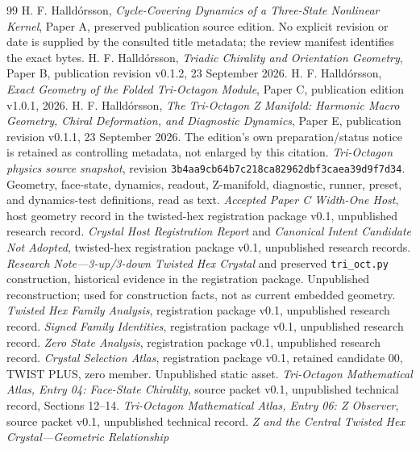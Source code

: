 \documentclass[11pt,a4paper]{article}
\numberwithin{equation}{section}
\begin{document}
\begin{thebibliography}{99}
H. F. Halldórsson, \emph{Cycle-Covering Dynamics of a Three-State Nonlinear
Kernel}, Paper A, preserved publication source edition. No explicit revision
or date is supplied by the consulted title metadata; the review manifest
identifies the exact bytes.
H. F. Halldórsson, \emph{Triadic Chirality and Orientation Geometry},
Paper B, publication revision v0.1.2, 23 September 2026.
H. F. Halldórsson, \emph{Exact Geometry of the Folded Tri-Octagon Module},
Paper C, publication edition v1.0.1, 2026.
H. F. Halldórsson, \emph{The Tri-Octagon Z Manifold: Harmonic Macro Geometry,
Chiral Deformation, and Diagnostic Dynamics}, Paper E, publication revision
v0.1.1, 23 September 2026. The edition's own preparation/status notice is
retained as controlling metadata, not enlarged by this citation.
\emph{Tri-Octagon physics source snapshot}, revision
\texttt{3b4aa9cb64b7c218ca82962dbf3caea39d9f7d34}.
Geometry, face-state, dynamics, readout, Z-manifold, diagnostic, runner,
preset, and dynamics-test definitions, read as text.
\emph{Accepted Paper C Width-One Host}, host geometry record in the
twisted-hex registration package v0.1, unpublished research record.
\emph{Crystal Host Registration Report} and
\emph{Canonical Intent Candidate Not Adopted}, twisted-hex registration
package v0.1, unpublished research records.
\emph{Research Note---3-up/3-down Twisted Hex Crystal} and preserved
\texttt{tri\_oct.py} construction, historical evidence in the registration
package. Unpublished reconstruction; used for construction facts, not as
current embedded geometry.
\emph{Twisted Hex Family Analysis}, registration package v0.1,
unpublished research record.
\emph{Signed Family Identities}, registration package v0.1,
unpublished research record.
\emph{Zero State Analysis}, registration package v0.1,
unpublished research record.
\emph{Crystal Selection Atlas}, registration package v0.1,
retained candidate 00, TWIST PLUS, zero member. Unpublished static asset.
\emph{Tri-Octagon Mathematical Atlas, Entry 04: Face-State Chirality},
source packet v0.1, unpublished technical record, Sections 12--14.
\emph{Tri-Octagon Mathematical Atlas, Entry 06: Z Observer},
source packet v0.1, unpublished technical record.
\emph{Z and the Central Twisted Hex Crystal---Geometric Relationship
}
\end{thebibliography}
\end{document}
